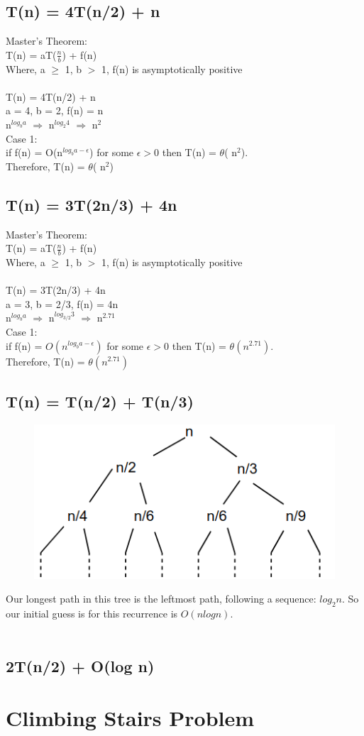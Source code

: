 \documentclass[10pt,letterpaper]{article}
\begin{document}
\subsection{T(n) = 4T(n/2) + n}
Master's Theorem:\\
T(n) = aT($\frac{n}{b}$) + f(n)\\
Where, a $\geq$ 1, b $>$ 1, f(n) is asymptotically positive\\
\\
T(n) = 4T(n/2) + n\\
a = 4, b = 2, f(n) = n\\
n$^{log_{b}a}$ $\Rightarrow$ n$^{log_{2}4}$ $\Rightarrow$ n$^{2}$\\
Case 1:\\
if f(n) = O(n$^{log_{b}a - \epsilon}$) for some $\epsilon > 0$ then T(n) = $\theta$( n$^{2}$).\\
Therefore, T(n) =  $\theta$( n$^{2}$)

\subsection{T(n) = 3T(2n/3) + 4n}
Master's Theorem:\\
T(n) = aT($\frac{n}{b}$) + f(n)\\
Where, a $\geq$ 1, b $>$ 1, f(n) is asymptotically positive\\
\\
T(n) = 3T(2n/3) + 4n\\
a = 3, b = 2/3, f(n) = 4n\\
n$^{log_{b}a}$ $\Rightarrow$ n$^{log_{3/2}3}$ $\Rightarrow$ n$^{2.71}$\\
Case 1:\\
if f(n) = $O(n^{log_{b}a - \epsilon})$ for some $\epsilon > 0$ then T(n) = $\theta(n^{2.71})$.\\
Therefore, T(n) =  $\theta(n^{2.71})$

\subsection{T(n) = T(n/2) + T(n/3)}

\begin{figure}[h]
	\includegraphics[scale = .25]{recurtree1hw5.png}
\end{figure}

\noindent Our longest path in this tree is the leftmost path, following a sequence: $log_{2}n$. So our initial guess is for this recurrence is $O(nlogn)$.\\
\\


\subsection{2T(n/2) + O(log n)}


\section{Climbing Stairs Problem}
\end{document}
